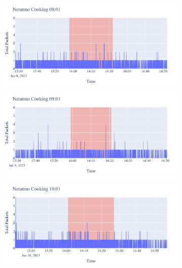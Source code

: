 \begin{figure}[H]
    \begin{subfigure}[b]{0.47\textwidth}
        \centering
        \includegraphics[width=1.2\hsize]{figures/Netatmo_Cooking_Packets_08.01.png}
    \end{subfigure}
    \begin{subfigure}[b]{0.47\textwidth}
        \centering
        \includegraphics[width=1.2\hsize]{figures/Netatmo_Cooking_Packets_09.01.png}
    \end{subfigure}
    \begin{subfigure}[b]{0.47\textwidth}
        \centering
        \includegraphics[width=1.2\hsize]{figures/Netatmo_Cooking_Packets_10.01.png}
    \end{subfigure}

\end{figure}
